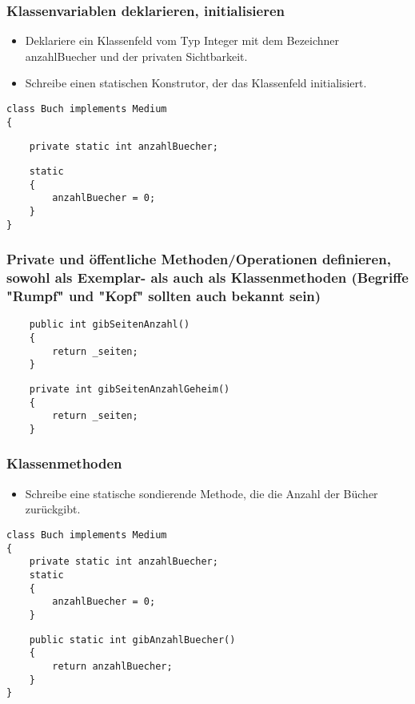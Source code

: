 \documentclass[mathserif]{beamer}
\begin{document}
\begin{frame}[fragile]
\frametitle{Klassenvariablen deklarieren, initialisieren}
\begin{itemize}
    \item Deklariere ein Klassenfeld vom Typ Integer mit dem Bezeichner anzahlBuecher und der privaten Sichtbarkeit.
    \item Schreibe einen statischen Konstrutor, der das Klassenfeld initialisiert.
    \end{itemize}
    \begin{lstlisting}
class Buch implements Medium
{
    \end{lstlisting}
    \pause
    \begin{lstlisting}
    private static int anzahlBuecher;
    \end{lstlisting}
    \pause
    \begin{lstlisting}
    static
    {
        anzahlBuecher = 0;
    }
}
    \end{lstlisting}
\end{frame}

\begin{frame}[fragile]
\frametitle{Private und \"offentliche Methoden/Operationen definieren, sowohl als Exemplar- als auch als Klassenmethoden (Begriffe "Rumpf" und "Kopf" sollten auch bekannt sein)}
 \begin{lstlisting}
    public int gibSeitenAnzahl()
    {
        return _seiten;
    }
    \end{lstlisting}
    \pause
     \begin{lstlisting}
    private int gibSeitenAnzahlGeheim()
    {
        return _seiten;
    }
    \end{lstlisting}
\end{frame}

\begin{frame}[fragile]
    \frametitle{Klassenmethoden}
    \begin{itemize}
        \item Schreibe eine statische sondierende Methode, die die Anzahl der Bücher zurückgibt.
        \end{itemize}
    \begin{lstlisting}
class Buch implements Medium
{
    private static int anzahlBuecher;
    static
    {
        anzahlBuecher = 0;
    }
    \end{lstlisting}
    \pause
    \begin{lstlisting}
    public static int gibAnzahlBuecher()
    {
        return anzahlBuecher;
    }
}
    \end{lstlisting}
\end{frame}
\end{document}
